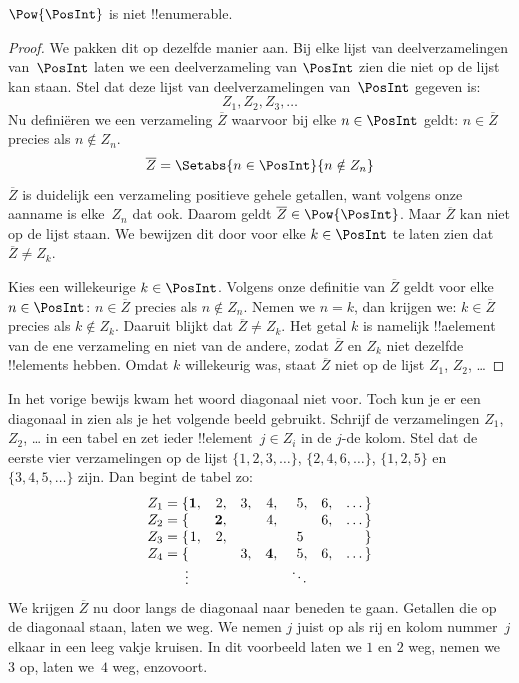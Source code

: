 \documentclass[openany]{memoir}
\begin{document}
\begin{thm}
$\Pow{\PosInt}$ is niet !!{enumerable}.
\end{thm}

\begin{proof}
We pakken dit op dezelfde manier aan. Bij elke lijst van
deelverzamelingen van~$\PosInt$ laten we een deelverzameling van
$\PosInt$ zien die niet op de lijst kan staan. Stel dat deze lijst van
deelverzamelingen van~$\PosInt$ gegeven is:
\[
Z_{1}, Z_{2}, Z_{3}, \dots
\]
Nu definiëren we een verzameling $\overline{Z}$ waarvoor bij elke
$n \in \PosInt$ geldt: $n \in \overline{Z}$ precies als $n \notin
Z_{n}$.
\[
\overline{Z} = \Setabs{n \in \PosInt}{n \notin Z_n}
\]
$\overline{Z}$ is duidelijk een verzameling positieve gehele getallen,
want volgens onze aanname is elke~$Z_n$ dat ook. Daarom geldt
$\overline{Z} \in \Pow{\PosInt}$. Maar $\overline{Z}$ kan niet op de
lijst staan. We bewijzen dit door voor elke $k \in \PosInt$ te laten
zien dat $\overline{Z} \neq Z_k$.

Kies een willekeurige $k \in \PosInt$. Volgens onze definitie van
$\overline{Z}$ geldt voor elke $n \in \PosInt$: $n \in \overline{Z}$
precies als $n \notin Z_n$. Nemen we $n=k$, dan krijgen we: $k \in
\overline{Z}$ precies als $k \notin Z_k$. Daaruit blijkt dat
$\overline{Z} \neq Z_k$. Het getal $k$ is namelijk !!a{element} van de
ene verzameling en niet van de andere, zodat $\overline{Z}$ en $Z_k$
niet dezelfde !!{element}s hebben. Omdat $k$ willekeurig was, staat
$\overline{Z}$ niet op de lijst $Z_1$, $Z_2$, \dots
\end{proof}

\begin{explain}
In het vorige bewijs kwam het woord diagonaal niet voor. Toch kun je er
een diagonaal in zien als je het volgende beeld gebruikt. Schrijf de
verzamelingen $Z_1$, $Z_2$, \dots{} in een tabel en zet ieder
!!{element}~$j \in Z_i$ in de $j$-de kolom. Stel dat de eerste vier
verzamelingen op de lijst $\{1,2,3,\dots\}$, $\{2, 4, 6, \dots\}$,
$\{1,2,5\}$ en $\{3,4,5,\dots\}$ zijn. Dan begint de tabel zo:
\[
\begin{array}{r@{}rrrrrrr}
  Z_1 = \{ & \mathbf{1}, & 2, & 3, & 4, & 5, & 6, & \dots\}\\
  Z_2 = \{ &  & \mathbf{2}, &  & 4, &  & 6, & \dots\}\\
  Z_3 = \{ & 1, & 2, &  &  & 5\phantom{,} &  & \}\\
  Z_4 = \{ &  &  & 3, & \mathbf{4}, & 5, & 6, & \dots\}\\
  \vdots & & & & & \ddots
\end{array}
\]
We krijgen $\overline{Z}$ nu door langs de diagonaal naar beneden te
gaan. Getallen die op de diagonaal staan, laten we weg. We nemen $j$
juist op als rij en kolom nummer~$j$ elkaar in een leeg vakje kruisen.
In dit voorbeeld laten we $1$ en $2$ weg, nemen we~$3$ op, laten we~$4$
weg, enzovoort.
\end{explain}
\end{document}
